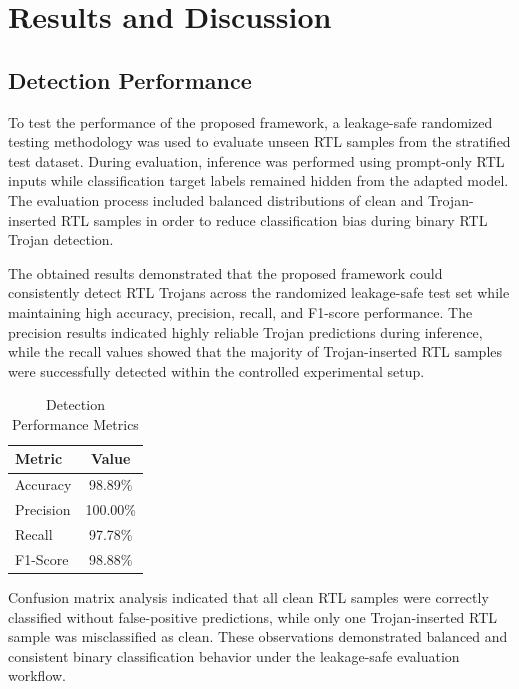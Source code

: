 \documentclass[conference]{IEEEtran}
\begin{document}

\section{Results and Discussion}
\label{sec:results}

\subsection{Detection Performance}
\label{subsec:detection_performance}

To test the performance of the proposed framework, a leakage-safe randomized testing methodology was used to evaluate unseen RTL samples from the stratified test dataset. During evaluation, inference was performed using prompt-only RTL inputs while classification target labels remained hidden from the adapted model. The evaluation process included balanced distributions of clean and Trojan-inserted RTL samples in order to reduce classification bias during binary RTL Trojan detection.

The obtained results demonstrated that the proposed framework could consistently detect RTL Trojans across the randomized leakage-safe test set while maintaining high accuracy, precision, recall, and F1-score performance. The precision results indicated highly reliable Trojan predictions during inference, while the recall values showed that the majority of Trojan-inserted RTL samples were successfully detected within the controlled experimental setup.

\begin{table}[!t]
\caption{Detection Performance Metrics}
\label{tab:detection_metrics}
\centering
\begin{tabular}{lc}
\toprule
Metric & Value \\
\midrule
Accuracy & 98.89\% \\
Precision & 100.00\% \\
Recall & 97.78\% \\
F1-Score & 98.88\% \\
\bottomrule
\end{tabular}
\end{table}

Confusion matrix analysis indicated that all clean RTL samples were correctly classified without false-positive predictions, while only one Trojan-inserted RTL sample was misclassified as clean. These observations demonstrated balanced and consistent binary classification behavior under the leakage-safe evaluation workflow.
\end{document}
